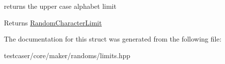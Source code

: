 returns the upper case alphabet limit 

\begin{DoxyReturn}{Returns}
\mbox{\hyperlink{structtestcaser_1_1maker_1_1RandomCharacterLimit}{Random\+Character\+Limit}} 
\end{DoxyReturn}


The documentation for this struct was generated from the following file\+:\begin{DoxyCompactItemize}
\item 
testcaser/core/maker/randoms/limits.\+hpp\end{DoxyCompactItemize}
